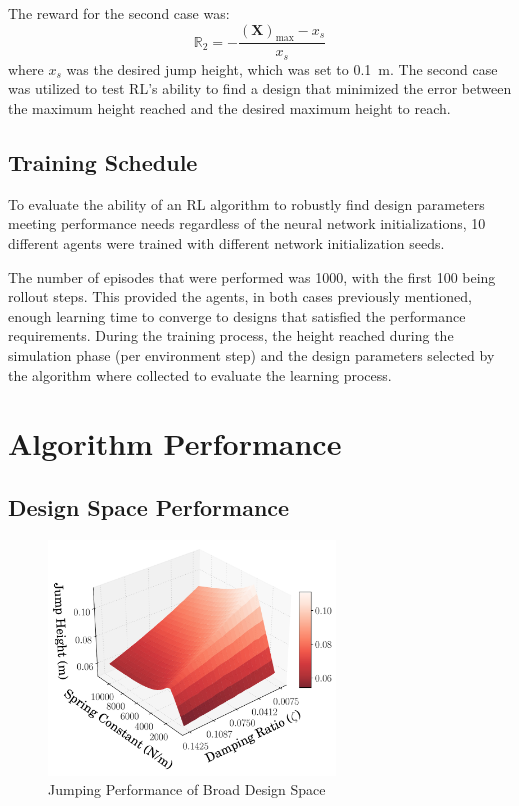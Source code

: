 \documentclass[10pt,twocolumn,letterpaper]{article}
\begin{document}
The reward for the second case was:
%
\begin{equation}
        \mathbb{R}_2 = - \frac{\left (\textbf{X}  \right )_{\text{max}} - x_{s}}{x_{s}}
\end{equation}
%
where $x_s$ was the desired jump height, which was set to 0.1~m. The second case was utilized to test RL's ability to find a design that minimized the error between the maximum height reached and the desired maximum height to reach. 

\subsection{Training Schedule}

To evaluate the ability of an RL algorithm to robustly find design parameters meeting performance needs regardless of the neural network initializations, 10 different agents were trained with different network initialization seeds.

The number of episodes that were performed was 1000, with the first 100 being rollout steps. This provided the agents, in both cases previously mentioned, enough learning time to converge to designs that satisfied the performance requirements. During the training process, the height reached during the simulation phase (per environment step) and the design parameters selected by the algorithm where collected to evaluate the learning process. 


\section{Algorithm Performance} 
\label{sec:results}

\subsection{Design Space Performance}
%
\begin{figure}[!t]
        \begin{center}
        \includegraphics[width = 3in]{figures/ppo_vs_td3/Design_3D_Plot_0.075_.pdf}  
        \caption{Jumping Performance of Broad Design Space}
        \label{fig:spring_zeta_height}
        \end{center}
\end{figure}
%
\end{document}
